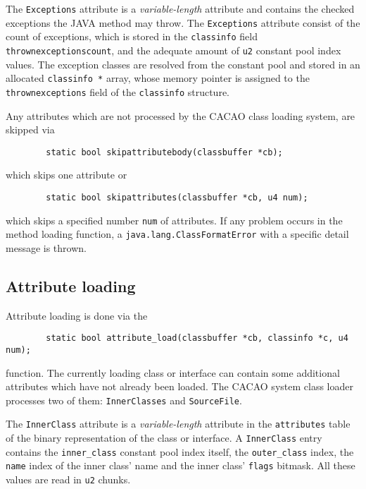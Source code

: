 The \texttt{Exceptions} attribute is a \textit{variable-length}
attribute and contains the checked exceptions the JAVA method may
throw. The \texttt{Exceptions} attribute consist of the count of
exceptions, which is stored in the \texttt{classinfo} field
\texttt{thrownexceptionscount}, and the adequate amount of \texttt{u2}
constant pool index values. The exception classes are resolved from
the constant pool and stored in an allocated \texttt{classinfo *}
array, whose memory pointer is assigned to the
\texttt{thrownexceptions} field of the \texttt{classinfo} structure.

Any attributes which are not processed by the CACAO class loading
system, are skipped via

\begin{verbatim}
        static bool skipattributebody(classbuffer *cb);
\end{verbatim}

which skips one attribute or

\begin{verbatim}
        static bool skipattributes(classbuffer *cb, u4 num);
\end{verbatim}

which skips a specified number \texttt{num} of attributes. If any
problem occurs in the method loading function, a
\texttt{java.lang.ClassFormatError} with a specific detail message is
thrown.


\subsection{Attribute loading}

Attribute loading is done via the

\begin{verbatim}
        static bool attribute_load(classbuffer *cb, classinfo *c, u4 num);
\end{verbatim}

function. The currently loading class or interface can contain some
additional attributes which have not already been loaded. The CACAO
system class loader processes two of them: \texttt{InnerClasses} and
\texttt{SourceFile}.

The \texttt{InnerClass} attribute is a \textit{variable-length}
attribute in the \texttt{attributes} table of the binary
representation of the class or interface. A \texttt{InnerClass} entry
contains the \texttt{inner\_class} constant pool index itself, the
\texttt{outer\_class} index, the \texttt{name} index of the inner
class' name and the inner class' \texttt{flags} bitmask. All these
values are read in \texttt{u2} chunks.

